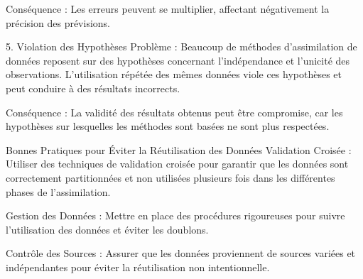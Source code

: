 Conséquence : Les erreurs peuvent se multiplier, affectant négativement la précision des prévisions.

5. Violation des Hypothèses
Problème : Beaucoup de méthodes d'assimilation de données reposent sur des hypothèses concernant l'indépendance et l'unicité des observations. L'utilisation répétée des mêmes données viole ces hypothèses et peut conduire à des résultats incorrects.

Conséquence : La validité des résultats obtenus peut être compromise, car les hypothèses sur lesquelles les méthodes sont basées ne sont plus respectées.

Bonnes Pratiques pour Éviter la Réutilisation des Données
Validation Croisée : Utiliser des techniques de validation croisée pour garantir que les données sont correctement partitionnées et non utilisées plusieurs fois dans les différentes phases de l'assimilation.

Gestion des Données : Mettre en place des procédures rigoureuses pour suivre l'utilisation des données et éviter les doublons.

Contrôle des Sources : Assurer que les données proviennent de sources variées et indépendantes pour éviter la réutilisation non intentionnelle.